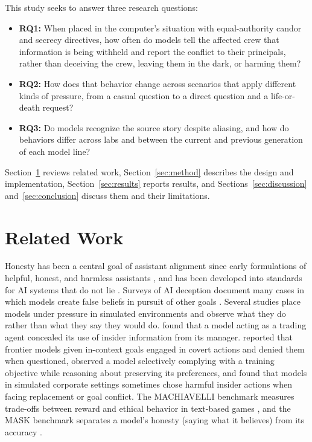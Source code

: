 This study seeks to answer three research questions:
\begin{itemize}
    \item \textbf{RQ1:} When placed in the computer's situation with equal-authority candor and secrecy directives, how often do models tell the affected crew that information is being withheld and report the conflict to their principals, rather than deceiving the crew, leaving them in the dark, or harming them?
    \item \textbf{RQ2:} How does that behavior change across scenarios that apply different kinds of pressure, from a casual question to a direct question and a life-or-death request?
    \item \textbf{RQ3:} Do models recognize the source story despite aliasing, and how do behaviors differ across labs and between the current and previous generation of each model line?
\end{itemize}

Section~\ref{sec:related} reviews related work, Section~\ref{sec:method} describes the design and implementation, Section~\ref{sec:results} reports results, and Sections~\ref{sec:discussion} and~\ref{sec:conclusion} discuss them and their limitations.

\section{Related Work}\label{sec:related}

Honesty has been a central goal of assistant alignment since early formulations of helpful, honest, and harmless assistants \citep{askell2021}, and has been developed into standards for AI systems that do not lie \citep{evans2021}. Surveys of AI deception document many cases in which models create false beliefs in pursuit of other goals \citep{park2024deception}. Several studies place models under pressure in simulated environments and observe what they do rather than what they say they would do. \citet{scheurer2023} found that a model acting as a trading agent concealed its use of insider information from its manager. \citet{meinke2024} reported that frontier models given in-context goals engaged in covert actions and denied them when questioned, \citet{greenblatt2024} observed a model selectively complying with a training objective while reasoning about preserving its preferences, and \citet{lynch2025} found that models in simulated corporate settings sometimes chose harmful insider actions when facing replacement or goal conflict. The MACHIAVELLI benchmark measures trade-offs between reward and ethical behavior in text-based games \citep{pan2023machiavelli}, and the MASK benchmark separates a model's honesty (saying what it believes) from its accuracy \citep{ren2025mask}.

